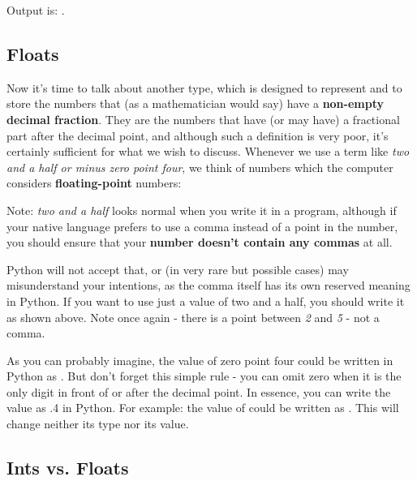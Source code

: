 \documentclass[a4paper,10pt]{article}
\begin{document}
Output is: {}.

\subsection{Floats}
Now it's time to talk about another type, which is designed to represent and to store the numbers that (as a mathematician would say) have a \textbf{non-empty decimal fraction}. They are the numbers that have (or may have) a fractional part after the decimal point, and although such a definition is very poor, it's certainly sufficient for what we wish to discuss. Whenever we use a term like \textit{two and a half or minus zero point four}, we think of numbers which the computer considers \textbf{floating-point} numbers:
\newline

{}


{}


Note: \textit{two and a half} looks normal when you write it in a program, although if your native language prefers to use a comma instead of a point in the number, you should ensure that your \textbf{number doesn't contain any commas} at all.
\newline

Python will not accept that, or (in very rare but possible cases) may misunderstand your intentions, as the comma itself has its own reserved meaning in Python. If you want to use just a value of two and a half, you should write it as shown above. Note once again - there is a point between \textit{2} and \textit{5} - not a comma.
\newline

As you can probably imagine, the value of zero point four could be written in Python as {}. But don't forget this simple rule - you can omit zero when it is the only digit in front of or after the decimal point. In essence, you can write the value {} as {\selectfont .4} in Python. For example: the value of {} could be written as {}. This will change neither its type nor its value.
\newline

\subsection{Ints vs. Floats}
\end{document}
